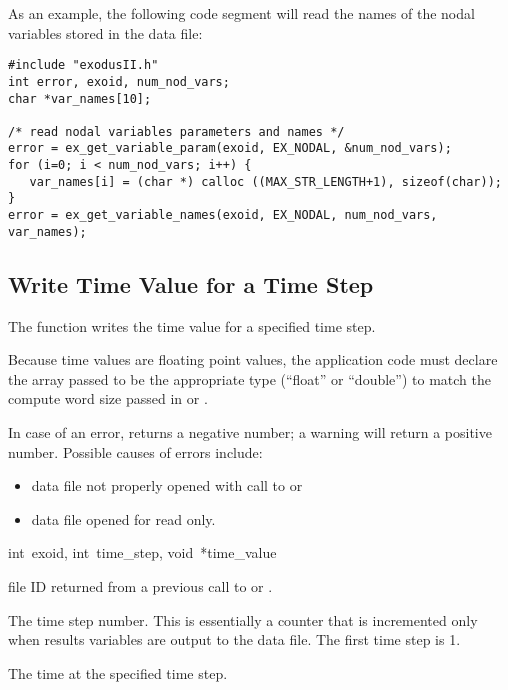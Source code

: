 As an example, the following code segment will read the names of the
nodal variables stored in the data file:

\begin{lstlisting}
#include "exodusII.h"
int error, exoid, num_nod_vars;
char *var_names[10];

/* read nodal variables parameters and names */
error = ex_get_variable_param(exoid, EX_NODAL, &num_nod_vars);
for (i=0; i < num_nod_vars; i++) {
   var_names[i] = (char *) calloc ((MAX_STR_LENGTH+1), sizeof(char));
}
error = ex_get_variable_names(exoid, EX_NODAL, num_nod_vars, var_names);
\end{lstlisting}

\subsection{Write Time Value for a Time Step}

The function  writes the time value for a
specified time step.

Because time values are floating point values, the application code
must declare the array passed to be the appropriate type (``float'' or
``double'') to match the compute word size passed in
 or .


In case of an error,  returns a negative number;
a warning will return a positive number. Possible causes of errors
include:

\begin{itemize}
 \item data file not properly opened with call to 
 or 

 \item data file opened for read only.
\end{itemize}


{int~exoid,
int~time_step,
void~*time_value}

\begin{parameters}
\item[{int exoid \R{}}]
\exo{} file ID returned from a previous call to  or
.

\item[{int time_step \R{}}]
The time step number. This is essentially a counter that is
incremented only when results variables are output to the data
file. The first time step is 1.

\item[{void* time_value \R{}}]
The time at the specified time step.
\end{parameters}

